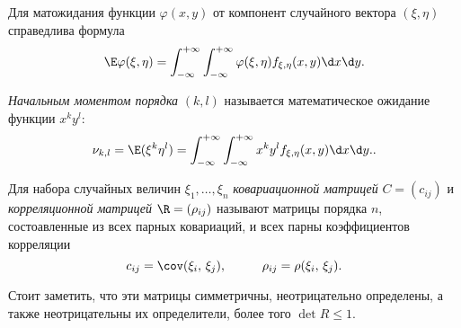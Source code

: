 \begin{to_thr}[]
    Для матожидания функции $\varphi(x, y)$ от компонент случайного вектора $(\xi, \eta)$ справедлива формула
    \begin{equation*}
        \E \varphi(\xi, \eta) = 
        \int_{-\infty}^{+\infty} \int_{-\infty}^{+\infty} \varphi(\xi, \eta) 
        f_{\xi, \eta} (x, y) \d x \d y.
    \end{equation*}
\end{to_thr}

\begin{to_def}
    \textit{Начальным моментом порядка} $(k, l)$ называется математическое ожидание функции $x^k y^l$:
    \begin{equation*}
        \nu_{k, l} = \E (\xi^k \eta^l)
        =
        \int_{-\infty}^{+\infty} \int_{-\infty}^{+\infty} 
        x^k y^l f_{\xi, \eta} (x, y) \d x \d y.
        .
    \end{equation*}
\end{to_def}




\begin{to_def}
    Для набора случайных величин $\xi_1, \ldots, \xi_n$ \textit{ковариационной матрицей} $C = (c_{ij})$ и \textit{корреляционной матрицей} $\R = (\rho_{ij})$ называют матрицы порядка $n$, состоавленные из всех парных ковариаций, и всех парны коэффициентов корреляции
    \begin{equation*}
        c_{ij} = \cov (\xi_i,\, \xi_j),
        \hspace{10 mm}
        \rho_{ij} = \rho(\xi_i,\, \xi_j).
    \end{equation*}
\end{to_def}
 
 Стоит заметить, что эти матрицы симметричны, неотрицательно определены, а также неотрицательны их определители, более того $\det R \leq 1$.